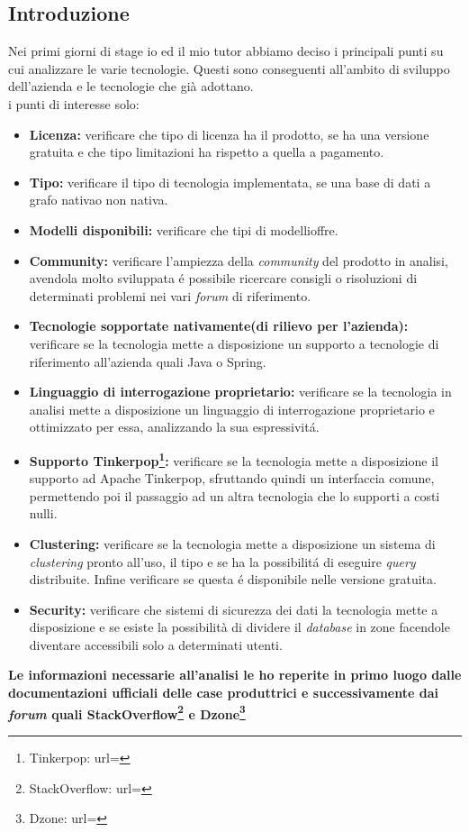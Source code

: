 \subsection{Introduzione}
Nei primi giorni di stage io ed il mio tutor abbiamo deciso i principali punti su cui analizzare le varie tecnologie. Questi sono conseguenti all'ambito di sviluppo dell'azienda e le tecnologie che già adottano.\\
i punti di interesse solo:
\begin{itemize}
\item{\textbf{Licenza:}} verificare che tipo di licenza ha il prodotto, se ha una versione gratuita e che tipo limitazioni ha rispetto a quella a pagamento.
\item{\textbf{Tipo:}} verificare il tipo di tecnologia implementata, se una base di dati a grafo nativa\glsfirstoccur o non nativa\glsfirstoccur.
\item{\textbf{Modelli disponibili:}} verificare che tipi di modelli\glsfirstoccur offre.
\item{\textbf{Community:}} verificare l'ampiezza della \textit{community} del prodotto in analisi, avendola molto sviluppata é possibile ricercare consigli o risoluzioni di determinati problemi nei vari \textit{forum} di riferimento.
\item{\textbf{Tecnologie sopportate nativamente(di rilievo per l'azienda):}} verificare se la tecnologia mette a disposizione un supporto a tecnologie di riferimento all'azienda quali Java o Spring.
\item{\textbf{Linguaggio di interrogazione proprietario:}} verificare se la tecnologia in analisi mette a disposizione un linguaggio di interrogazione proprietario e ottimizzato per essa, analizzando la sua espressivitá.
\item{\textbf{Supporto Tinkerpop\footnote{Tinkerpop: url= }:}} verificare se la tecnologia mette a disposizione il supporto ad Apache Tinkerpop, sfruttando quindi un interfaccia comune, permettendo poi il passaggio ad un altra tecnologia che lo supporti a costi nulli.
\item{\textbf{Clustering\glsfirstoccur:}} verificare se la tecnologia mette a disposizione un sistema di \textit{clustering} pronto all'uso, il tipo e se ha la possibilitá di eseguire \textit{query} distribuite. Infine verificare se questa é disponibile nelle versione gratuita.
\item{\textbf{Security:}} verificare che sistemi di sicurezza dei dati la tecnologia mette a disposizione e se esiste la possibilità di dividere il \textit{database} in zone facendole diventare accessibili solo a determinati utenti.\\

\end{itemize}
\textbf{Le informazioni necessarie all'analisi le ho reperite in primo luogo dalle documentazioni ufficiali delle case produttrici e successivamente dai \textit{forum} quali StackOverflow\footnote{StackOverflow: url= } e Dzone\footnote{Dzone: url= }}
